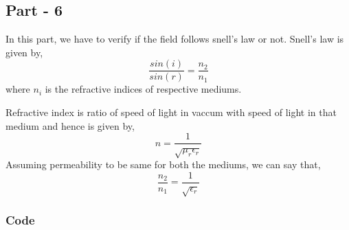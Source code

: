 \documentclass[11pt]{article}
\begin{document}
    \hypertarget{part---6}{%
\subsection{Part - 6}\label{part---6}}

In this part, we have to verify if the field follows snell's law or not.
Snell's law is given by, \[ \frac{sin(i)}{sin(r)} = \frac{n_2}{n_1} \]
where \(n_i\) is the refractive indices of respective mediums.

Refractive index is ratio of speed of light in vaccum with speed of
light in that medium and hence is given by,
\[ n=\frac{1}{\sqrt{\mu_r \epsilon_r}} \] Assuming permeability to be
same for both the mediums, we can say that,
\[ \frac{n_2}{n_1}=\frac{1}{\sqrt{\epsilon_r}} \]

    \hypertarget{code}{%
\subsubsection{Code}\label{code}}
\end{document}
